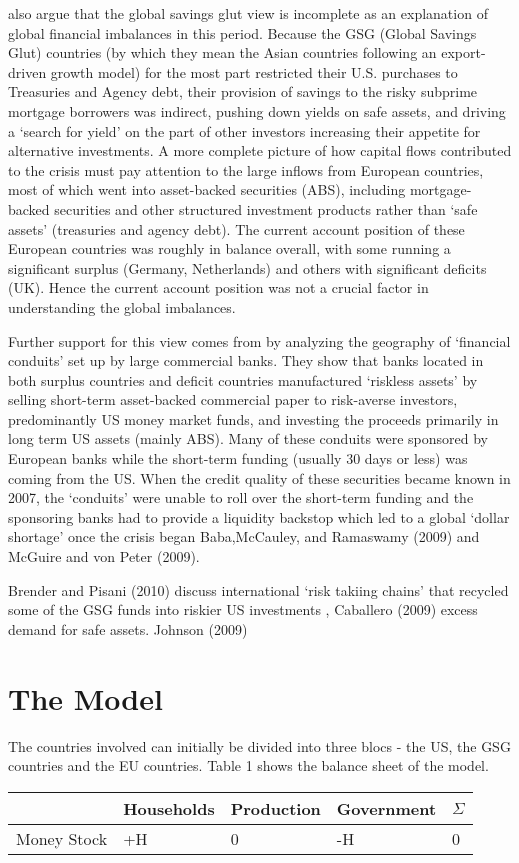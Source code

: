\documentclass[twoside,a4paper,11pt]{article}
\begin{document}
\cite{Bertaut2012} also argue that the global savings glut view is incomplete as an explanation of global  financial  imbalances in this period. Because the GSG (Global Savings Glut) countries (by which they mean the Asian countries following an export-driven growth model) for the most part restricted their U.S. purchases to Treasuries and Agency debt, their provision of savings to the risky subprime mortgage borrowers was indirect, pushing down yields on safe assets, and driving a `search for yield' on the part of other investors increasing their appetite for alternative investments. A more complete picture of how capital flows contributed to the crisis must pay attention to the large inflows from European countries, most of which went into asset-backed securities (ABS), including mortgage-backed securities and other structured investment products rather than `safe assets' (treasuries and agency debt). The current account position of these European countries was roughly in balance overall, with some running a significant surplus (Germany, Netherlands) and others with significant deficits (UK). Hence the current account position was not a crucial factor in understanding the global imbalances.

Further support for this view comes from \cite{Acharya2010a} by analyzing the geography of `financial conduits' set up by large commercial banks. They show that  banks located in both surplus countries and deficit countries manufactured `riskless assets' by selling short-term asset-backed commercial paper to risk-averse investors, predominantly US money market funds, and investing the proceeds primarily in long term US assets (mainly ABS). Many of these conduits were sponsored by European banks while the short-term funding (usually 30 days or less) was coming from the US. When the credit quality of these securities became known in 2007, the `conduits'  were unable to roll over the short-term funding and the sponsoring banks had to provide a liquidity backstop which led to a global `dollar shortage' once the crisis began \cite{}
Baba,McCauley, and Ramaswamy (2009) and McGuire and von Peter (2009).

Brender and Pisani (2010) discuss international `risk takiing chains' that recycled some of the GSG funds into riskier US investments , Caballero (2009) excess demand for safe assets. Johnson (2009)

\section{The Model}
The countries involved can initially be divided into three blocs - the US, the GSG countries and the EU countries.   
Table 1 shows the balance sheet of the model.
\begin{center}
\begin{tabular}{lllll}
\hline
& Households & Production & Government & $\Sigma$  \\
\hline
Money Stock & +H & 0 & -H & 0 \\
\hline
\end{tabular}
\end{center}
\end{document}
